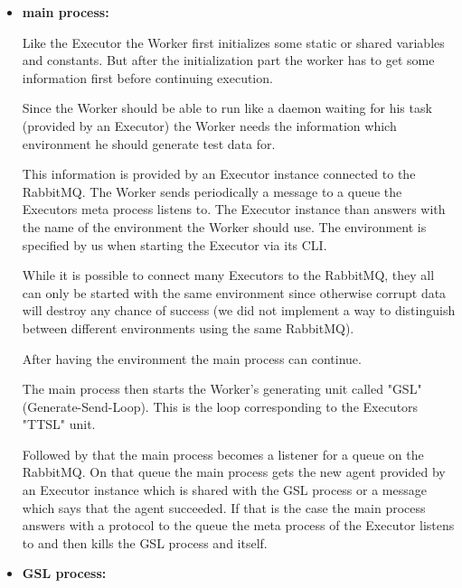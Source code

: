 \begin{itemize}[label={}]

  \item \textbf{main process:}

        Like the Executor the Worker first initializes
        some static or shared variables and constants.
        But after the initialization part the worker has
        to get some information first before continuing
        execution.

        Since the Worker should be able to run like a
        daemon waiting for his task (provided by an
        Executor) the Worker needs the information which
        environment he should generate test data for.

        This information is provided by an Executor
        instance connected to the RabbitMQ. The Worker
        sends periodically a message to a queue the
        Executors meta process listens to. The Executor
        instance than answers with the name of the
        environment the Worker should use. The environment
        is specified by us when starting the Executor via
        its CLI.

        While it is possible to connect many Executors to
        the RabbitMQ, they all can only be started with
        the same environment since otherwise corrupt data
        will destroy any chance of success (we did not
        implement a way to distinguish between different
        environments using the same RabbitMQ).

        After having the environment the main process can
        continue.

        The main process then starts the Worker's
        generating unit called "GSL" (Generate-Send-Loop).
        This is the loop corresponding to the Executors
        "TTSL" unit.

        Followed by that the main process becomes a
        listener for a queue on the RabbitMQ. On that queue
        the main process gets the new agent provided by an
        Executor instance which is shared with the GSL
        process or a message which says that the agent
        succeeded. If that is the case the main process
        answers with a protocol to the queue the meta
        process of the Executor listens to and then kills
        the GSL process and itself.

  \item \textbf{GSL process:}


\end{itemize}
